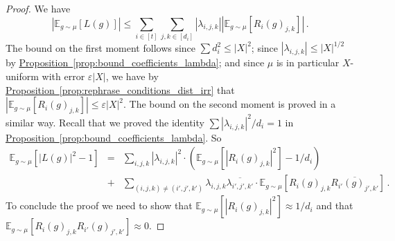 \documentclass[10pt]{article}
\theoremstyle{definition}
\numberwithin{equation}{section}
\newcommand{\expref}[2]{\texorpdfstring{\hyperref[#2]{#1~\ref{#2}}}{#1~\ref{#2}}}
\def\E{\mathbb{E}}
\def\eps{\varepsilon}
\begin{document}
\begin{proof}
We have
$$
|\E_{g \sim \mu} [L(g)]| \le \sum_{i \in [t]} \sum_{j,k \in [d_i]}
|\lambda_{i,j,k}| |\E_{g \sim \mu} [R_i(g)_{j,k}]|\,.
$$
The bound on the first moment follows since $\sum d_i^2
\le |X|^2$; since $|\lambda_{i,j,k}| \le |X|^{1/2}$ by
\expref{Proposition}{prop:bound_coefficients_lambda}; and since $\mu$
is in particular $X$-uniform with error $\eps |X|$, we have by
\expref{Proposition}{prop:rephrase_conditions_dist_irr} that $|\E_{g \sim
\mu}[R_i(g)_{j,k}]| \le \eps |X|^2$. The bound on the second moment is
proved in a similar way. Recall that we proved the identity $\sum |\lambda_{i,j,k}|^2/d_i=1$ in
\expref{Proposition}{prop:bound_coefficients_lambda}. So
\begin{eqnarray*}
\E_{g \sim \mu} [|L(g)|^2-1] &=& \sum_{i,j,k}
|\lambda_{i,j,k}|^2 \cdot \left(\E_{g \sim \mu}[|R_i(g)_{j,k}|^2] - 1/d_i\right)\\
&+& \sum_{(i,j,k) \ne (i',j',k')} \lambda_{i,j,k}
\overline{\lambda_{i',j',k'}} \cdot
\E_{g \sim \mu}[R_i(g)_{j,k} \overline{R_{i'}(g)_{j',k'}}]\,.
\end{eqnarray*}
To conclude the proof we need to show that $\E_{g \sim
\mu}[|R_i(g)_{j,k}|^2] \approx 1/d_i$ and that $\E_{g \sim
\mu}[R_i(g)_{j,k} R_{i'}(g)_{j',k'}] \approx 0$.


\end{proof}
\end{document}
